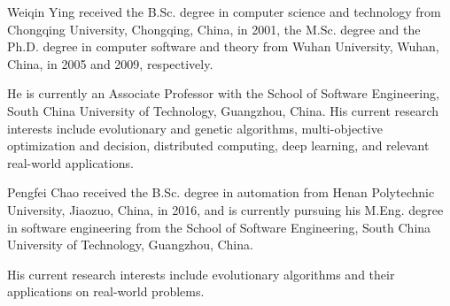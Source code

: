 \documentclass[10pt, journal]{IEEEtran}
\begin{document}


%

%


	\begin{IEEEbiography}{Weiqin Ying}
		received the B.Sc. degree in computer science and technology from
		Chongqing University, Chongqing, China, in 2001, the M.Sc. degree
		and the Ph.D. degree in computer software and theory from Wuhan
		University, Wuhan, China, in 2005 and 2009, respectively.

        He is currently an Associate Professor with the School of Software
		Engineering, South China University of Technology, Guangzhou, China.
		His current research interests include evolutionary and genetic
		algorithms, multi-objective optimization and decision, distributed computing, deep learning, and relevant real-world
		applications.
		
	\end{IEEEbiography}

\begin{IEEEbiography}{Pengfei Chao}
		received the B.Sc. degree in automation  from
		Henan Polytechnic University, Jiaozuo, China, in 2016, and is currently
        pursuing his M.Eng. degree in software engineering from the School of Software Engineering,
        South China University of Technology, Guangzhou, China.

        His current research interests include evolutionary algorithms and their
        applications on real-world problems.	
	\end{IEEEbiography}	
	
\end{document}
